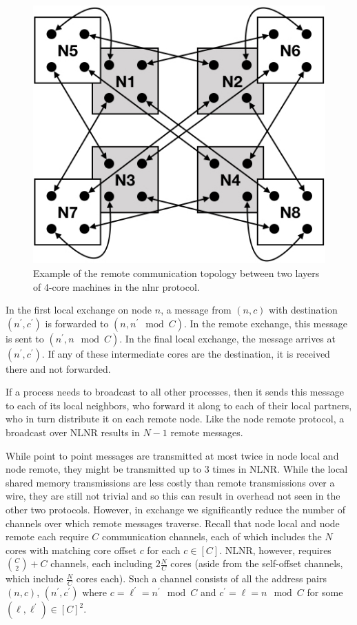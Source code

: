 \documentclass{report}
\begin{document}
\begin{figure}[htbp] 
\centerline{\includegraphics[width=0.6\columnwidth]{inter_layer_nlnr}}
\caption{Example of the remote communication topology between two layers of 4-core machines in the nlnr protocol.
\label{fig:inter_layer_nlnr}}
\end{figure}

In the first local exchange on node $n$, a message from $(n, c)$ with destination $(n^\prime, c^\prime)$ is forwarded to $(n, n^\prime \mod C)$.
In the remote exchange, this message is sent to $(n^\prime, n \mod C)$.
In the final local exchange, the message arrives at $(n^\prime, c^\prime)$.
If any of these intermediate cores are the destination, it is received there and not forwarded. 

If a process needs to broadcast to all other processes, then it sends this message to each of its local neighbors, who forward it along to each of their local partners, who in turn distribute it on each remote node.
Like the node remote protocol, a broadcast over NLNR results in $N-1$ remote messages. 

While point to point messages are transmitted at most twice in node local and node remote, they might be transmitted up to 3 times in NLNR. 
While the local shared memory transmissions are less costly than remote transmissions over a wire, they are still not trivial and so this can result in overhead not seen in the other two protocols. 
However, in exchange we significantly reduce the number of channels over which remote messages traverse.
Recall that node local and node remote each require $C$ communication channels, each of which includes the $N$ cores with matching core offset $c$ for each $c \in [C]$. 
NLNR, however, requires ${C \choose 2} + C$ channels, each including $2\frac{N}{C}$ cores (aside from the self-offset channels, which include $\frac{N}{C}$ cores each).
Such a channel consists of all the address pairs $(n, c)$, $(n^\prime, c^\prime)$ where $c = \ell^\prime = n^\prime \mod C$ and $c^\prime = \ell = n \mod C$ for some $(\ell, \ell^\prime) \in [C]^2$.
\end{document}
